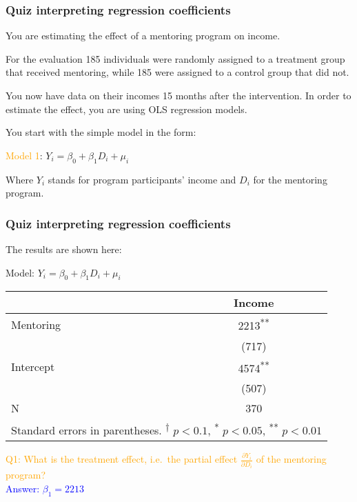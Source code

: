 \documentclass[12pt,english,dvipsnames,aspectratio=169,handout]{beamer}\usepackage[]{graphicx}\usepackage[]{xcolor}
\begin{document}
\begin{frame}
	\frametitle{Quiz interpreting regression coefficients}
\footnotesize

You are estimating the effect of a mentoring program on income. 
  
For the evaluation 185 individuals were randomly assigned to a treatment group that received mentoring, while 185 were assigned to a control group that did not. 

You now have data on their incomes 15 months after the intervention. In order to estimate the effect, you are using OLS regression models. 

You start with the simple model in the form:

\normalsize\vspace{3mm}
\textcolor{orange}{Model 1}: ${Y}_i = \beta_0 + \beta_1 {D}_i + \mu_i$
\footnotesize

Where $Y_i$ stands for program participants' income and $D_i$ for the mentoring program.

\end{frame}


\begin{frame}
	\frametitle{Quiz interpreting regression coefficients}
\footnotesize
The results are shown here:

\centering
\tiny
Model: ${Y}_i = \beta_0 + \beta_1 {D}_i + \mu_i$

\scriptsize
\begin{tabular}{l*{1}{c}}
\toprule
          &\multicolumn{1}{c}{Income}\\
\midrule
Mentoring     &     2213\textsuperscript{**}\\
          &    (717)        \\
Intercept    &     4574\textsuperscript{**}\\
          &    (507)        \\
\midrule
N         &      370        \\
\bottomrule
\multicolumn{2}{l}{Standard errors in parentheses. \textsuperscript{†} \(p<0.1\), \textsuperscript{*} \(p<0.05\), \textsuperscript{**} \(p<0.01\)}\\
\end{tabular}

\footnotesize\flushleft

\textcolor{orange}{Q1: What is the treatment effect, i.e.\ the partial effect $\frac{\partial Y_i}{\partial {D}_i}$ of the mentoring program?}\\
\textcolor{blue}{Answer: $\beta_1 = 2213$}

\end{frame}
\end{document}
